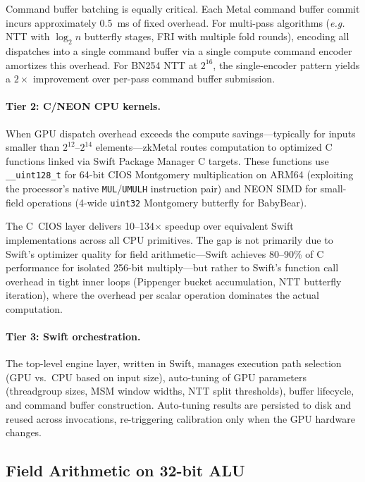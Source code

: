 \documentclass[letterpaper,twocolumn,10pt]{article}
\newcommand{\sys}{zkMetal\xspace}
\newcommand{\eg}{\textit{e.g.}\xspace}
\begin{document}
Command buffer batching is equally critical. Each Metal command buffer
commit incurs approximately 0.5~ms of fixed overhead. For multi-pass
algorithms (\eg NTT with $\log_2 n$ butterfly stages, FRI with multiple
fold rounds), encoding all dispatches into a single command buffer via a
single compute command encoder amortizes this overhead. For BN254 NTT at
$2^{16}$, the single-encoder pattern yields a $2\times$ improvement over
per-pass command buffer submission.

\paragraph{Tier 2: C/NEON CPU kernels.} When GPU dispatch overhead
exceeds the compute savings---typically for inputs smaller than
$2^{12}$--$2^{14}$ elements---\sys routes computation to optimized C
functions linked via Swift Package Manager C targets. These functions use
\texttt{\_\_uint128\_t} for 64-bit CIOS Montgomery multiplication on ARM64
(exploiting the processor's native \texttt{MUL}/\texttt{UMULH} instruction
pair) and NEON SIMD for small-field operations (4-wide \texttt{uint32}
Montgomery butterfly for BabyBear).

The C~CIOS layer delivers 10--134$\times$ speedup over equivalent Swift
implementations across all CPU primitives. The gap is not primarily due to
Swift's optimizer quality for field arithmetic---Swift achieves 80--90\% of
C performance for isolated 256-bit multiply---but rather to Swift's
function call overhead in tight inner loops (Pippenger bucket accumulation,
NTT butterfly iteration), where the overhead per scalar operation dominates
the actual computation.

\paragraph{Tier 3: Swift orchestration.} The top-level engine layer,
written in Swift, manages execution path selection (GPU vs.\ CPU based on
input size), auto-tuning of GPU parameters (threadgroup sizes, MSM window
widths, NTT split thresholds), buffer lifecycle, and command buffer
construction. Auto-tuning results are persisted to disk and reused across
invocations, re-triggering calibration only when the GPU hardware changes.

\subsection{Field Arithmetic on 32-bit ALU}
\label{sec:field-arith}
\end{document}
